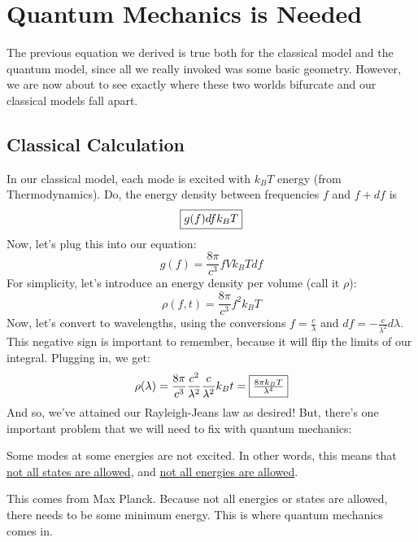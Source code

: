       \section{Quantum Mechanics is Needed}
        The previous equation we derived is true both for the classical model and the quantum model, since all we really invoked was some basic geometry. However, we are now about to see exactly where these two worlds bifurcate and our classical models fall apart.

        \subsection{Classical Calculation}
          In our classical model, each mode is excited with $k_BT$ energy (from Thermodynamics). Do, the energy density between frequencies $f$ and $f+df$ is $$\fbox{$g(f)dfk_BT$}$$
          Now, let's plug this into our equation:
          $$g(f) = \frac{8\pi}{c^3}fVk_BTdf$$
          For simplicity, let's introduce an energy density per volume (call it $\rho$):
          $$\rho(f,t) = \frac{8\pi}{c^3}f^2k_BT$$
          Now, let's convert to wavelengths, using the conversions $f = \frac{c}{\lambda}$ and $df = -\frac{c}{\lambda^2}d\lambda$. This negative sign is important to remember, because it will flip the limits of our integral. Plugging in, we get:
          $$\rho(\lambda) = \frac{8\pi}{c^3}\frac{c^2}{\lambda^2}\frac{c}{\lambda^2}k_Bt = \fbox{$\frac{8\pi k_BT}{\lambda^4}$}$$
          And so, we've attained our Rayleigh-Jeans law as desired! But, there's one important problem that we will need to fix with quantum mechanics:
          \begin{insight*}{}{}
            Some modes at some energies are not excited. In other words, this means that \underline{not all states are allowed}, and \underline{not all energies are allowed}.
          \end{insight*}
          This comes from Max Planck. Because not all energies or states are allowed, there needs to be some minimum energy. This is where quantum mechanics comes in.

